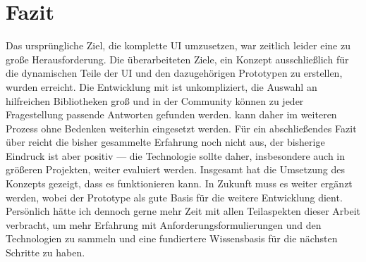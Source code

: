\chapter{Fazit}\label{chap:conclusion}
Das ursprüngliche Ziel, die komplette UI umzusetzen, war zeitlich leider eine zu große Herausforderung. Die überarbeiteten Ziele, ein Konzept ausschließlich für die dynamischen Teile der  UI und den dazugehörigen Prototypen zu erstellen, wurden erreicht.
Die Entwicklung mit  ist unkompliziert, die Auswahl an hilfreichen Bibliotheken groß und in der Community können zu jeder Fragestellung passende Antworten gefunden werden.  kann daher im weiteren Prozess ohne Bedenken weiterhin eingesetzt werden. Für ein abschließendes Fazit über  reicht die bisher gesammelte Erfahrung noch nicht aus, der bisherige Eindruck ist aber positiv --- die Technologie sollte daher, insbesondere auch in größeren Projekten, weiter evaluiert werden.
Insgesamt hat die Umsetzung des Konzepts gezeigt, dass es funktionieren kann. In Zukunft muss es weiter ergänzt werden, wobei der Prototype als gute Basis für die weitere Entwicklung dient. Persönlich hätte ich dennoch gerne mehr Zeit mit allen Teilaspekten dieser Arbeit verbracht, um mehr Erfahrung mit Anforderungsformulierungen und den Technologien zu sammeln und eine fundiertere Wissensbasis für die nächsten Schritte zu haben.

